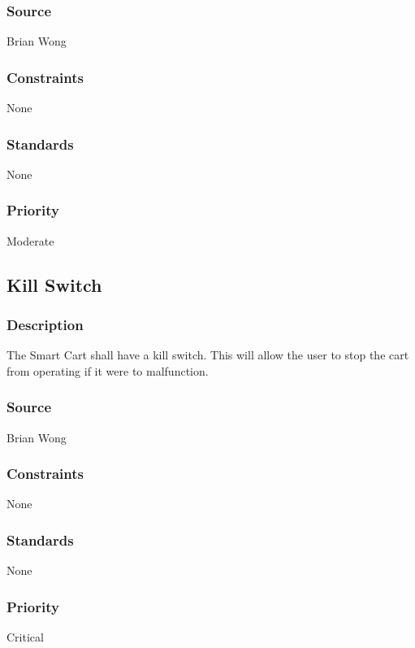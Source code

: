 \subsubsection{Source}
Brian Wong
\subsubsection{Constraints}
None
\subsubsection{Standards}
None
\subsubsection{Priority}
Moderate


\subsection{Kill Switch}
\subsubsection{Description}
The Smart Cart shall have a kill switch. This will allow the user to stop the cart from operating if it were to malfunction.
\subsubsection{Source}
Brian Wong
\subsubsection{Constraints}
None
\subsubsection{Standards}
None
\subsubsection{Priority}
Critical
